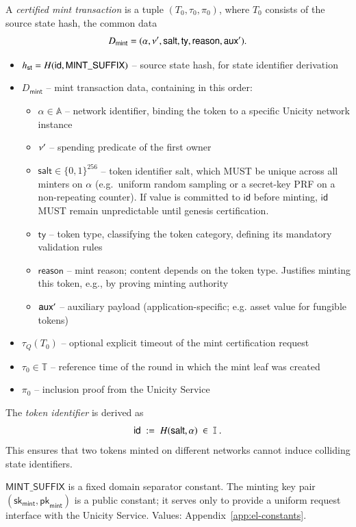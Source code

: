 A \emph{certified mint transaction} is a tuple $(T_0, \tau_0, \pi_0)$, where $T_0$ consists of the source state hash, the common data
\[
D_\mathsf{mint} = (\alpha, \nu', \mathsf{salt}, \mathsf{ty}, \mathsf{reason}, \mathsf{aux}') .
\]
\begin{itemize}
	\item ${h_\mathsf{st}} = H(\mathsf{id}, \mathsf{MINT\_SUFFIX})$ -- source state hash, for state identifier derivation
	\item $D_\mathsf{mint}$ -- mint transaction data, containing in this order:
	\begin{itemize}
		\item $\alpha \in \mathbb{A}$ -- network identifier, binding the token to a specific Unicity network instance
		\item $\nu'$ -- spending predicate of the first owner
		\item $\mathsf{salt} \in \{0,1\}^{256}$ -- token identifier salt, which MUST be unique across all minters on $\alpha$ (e.g.\ uniform random sampling or a secret-key PRF on a non-repeating counter). If value is committed to $\mathsf{id}$ before minting, $\mathsf{id}$ MUST remain unpredictable until genesis certification.
		\item $\mathsf{ty}$ -- token type, classifying the token category, defining its mandatory validation rules
		\item $\mathsf{reason}$ -- mint reason; content depends on the token type. Justifies minting this token, e.g., by proving minting authority
		\item $\mathsf{aux}'$ -- auxiliary payload (application-specific; e.g. asset value for fungible tokens)
	\end{itemize}
	\item $\tau_Q(T_0)$ -- optional explicit timeout of the mint certification request
	\item $\tau_0\in\mathbb T$ -- reference time of the round in which the mint leaf was created
	\item $\pi_0$ -- inclusion proof from the Unicity Service
\end{itemize}

The \emph{token identifier} is derived as
\[
\mathsf{id} \;:=\; H(\mathsf{salt}, \alpha) \;\in\; \mathbb{I} \;.
\]
This ensures that two tokens minted on different networks cannot induce colliding state identifiers.

$\mathsf{MINT\_SUFFIX}$ is a fixed domain separator constant. The minting key pair $(\mathsf{sk}_\mathsf{mint}, \mathsf{pk}_\mathsf{mint})$ is a public constant; it serves only to provide a uniform request interface with the Unicity Service. Values: Appendix~\ref{app:el-constants}.


